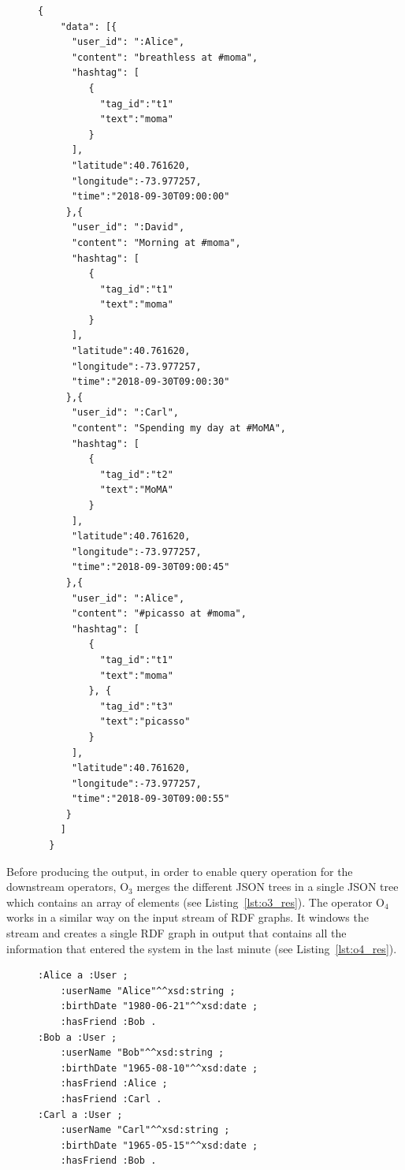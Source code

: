\begin{Example}
\begin{figure}[p]
\begin{minipage}{0.95\linewidth}
\begin{lstlisting}[caption={Example of result of the O$_3$ operators.},label=lst:o3_res,style=JSON]
  {
    "data": [{
      "user_id": ":Alice",
      "content": "breathless at #moma",
      "hashtag": [
         { 
           "tag_id":"t1"
           "text":"moma"
         }
      ],
      "latitude":40.761620,
      "longitude":-73.977257,
      "time":"2018-09-30T09:00:00"
     },{
      "user_id": ":David",
      "content": "Morning at #moma",
      "hashtag": [
         { 
           "tag_id":"t1"
           "text":"moma"
         }
      ],
      "latitude":40.761620,
      "longitude":-73.977257,
      "time":"2018-09-30T09:00:30"
     },{
      "user_id": ":Carl",
      "content": "Spending my day at #MoMA",
      "hashtag": [
         { 
           "tag_id":"t2"
           "text":"MoMA"
         }
      ],
      "latitude":40.761620,
      "longitude":-73.977257,
      "time":"2018-09-30T09:00:45"
     },{
      "user_id": ":Alice",
      "content": "#picasso at #moma",
      "hashtag": [
         { 
           "tag_id":"t1"
           "text":"moma"
         }, { 
           "tag_id":"t3"
           "text":"picasso"
         }
      ],
      "latitude":40.761620,
      "longitude":-73.977257,
      "time":"2018-09-30T09:00:55"
     }
    ]
  }
\end{lstlisting}
\end{minipage}
\end{figure}

Before producing the output, in order to enable query operation for the downstream operators, O$_3$ merges the different JSON trees in a single JSON tree which contains an array of elements (see Listing~\ref{lst:o3_res}).
The operator O$_4$ works in a similar way on the input stream of RDF graphs. It windows the stream and creates a single RDF graph in output that contains all the information that entered the system in the last minute (see Listing~\ref{lst:o4_res}).

\begin{figure}[ht]
\begin{minipage}{0.95\linewidth}
\begin{lstlisting}[caption={Example of result of the O$_4$ operator.},label=lst:o4_res,style=N3]
:Alice a :User ;
    :userName "Alice"^^xsd:string ;
    :birthDate "1980-06-21"^^xsd:date ;
    :hasFriend :Bob .
:Bob a :User ;
    :userName "Bob"^^xsd:string ;
    :birthDate "1965-08-10"^^xsd:date ;
    :hasFriend :Alice ;
    :hasFriend :Carl .
:Carl a :User ;
    :userName "Carl"^^xsd:string ;
    :birthDate "1965-05-15"^^xsd:date ;
    :hasFriend :Bob .
\end{lstlisting}
\end{minipage}
\end{figure}

\end{Example}


